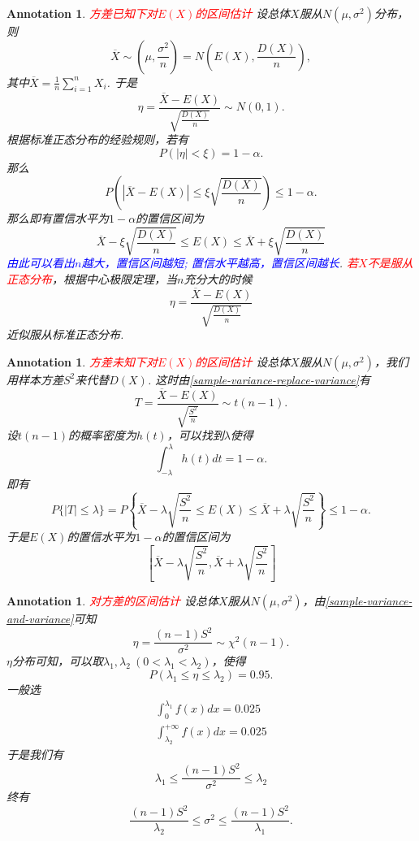 \documentclass{article}
\newtheorem{annotation}[theorem]{Annotation}
\newcommand{\redt}[1]{\textcolor{red}{#1}}
\newcommand{\bluet}[1]{\textcolor{blue}{#1}}
\begin{document}
\begin{annotation}
\rm \redt{方差已知下对$E(X)$的区间估计} 设总体$X$服从$N(\mu,\sigma^2)$分布，则
$$
\overline{X} \sim \left(\mu, \frac{\sigma^2}{n}\right) = N\left(E(X),\frac{D(X)}{n}\right),
$$
其中$\overline{X}= \frac{1}{n}\sum\limits_{i=1}^n X_i$. 于是
$$
\eta = \frac{\overline{X}-E(X)}{\sqrt{\frac{D(X)}{n}}} \sim N(0,1). 
$$
根据标准正态分布的经验规则，若有
$$
P\left(|\eta| < \xi\right) = 1-\alpha.   
$$
那么
$$
P\left( |\overline{X}-E(X)| \leq \xi \sqrt{\frac{D(X)}{n}}   \right) \leq 1-\alpha.
$$
那么即有置信水平为$1-\alpha$的置信区间为
$$
\overline{X} - \xi \sqrt{\frac{D(X)}{n}} \leq E(X) \leq  \overline{X} + \xi \sqrt{\frac{D(X)}{n}}
$$
\bluet{由此可以看出$n$越大，置信区间越短; 置信水平越高，置信区间越长}. \redt{若$X$不是服从正态分布}，根据中心极限定理，当$n$充分大的时候
$$
\eta = \frac{\overline{X}-E(X)}{\sqrt{\frac{D(X)}{n}}}
$$
近似服从标准正态分布. 
\end{annotation}

\begin{annotation}
\rm \redt{方差未知下对$E(X)$的区间估计} 设总体$X$服从$N(\mu,\sigma^2)$，我们用样本方差$S^2$来代替$D(X)$. 这时由\ref{sample-variance-replace-variance}有
$$
T=\frac{\overline{X}-E(X)}{\sqrt{\frac{S^2}{n}}} \sim t(n-1).
$$
设$t(n-1)$的概率密度为$h(t)$，可以找到$\lambda$使得
$$
\int_{-\lambda}^{\lambda} h(t)dt = 1-\alpha.
$$
即有
$$
P\{|T| \leq \lambda \} = P\left\{ \overline{X} - \lambda \sqrt{\frac{S^2}{n}} \leq E(X) \leq  \overline{X} + \lambda \sqrt{\frac{S^2}{n}} \right\} \leq 1-\alpha.
$$
于是$E(X)$的置信水平为$1-\alpha$的置信区间为
$$
\left[ \overline{X} - \lambda \sqrt{\frac{S^2}{n}} ,  \overline{X} + \lambda \sqrt{\frac{S^2}{n}} \right]
$$
\end{annotation}

\begin{annotation}
\rm \redt{对方差的区间估计} 设总体$X$服从$N(\mu,\sigma^2)$，由\ref{sample-variance-and-variance}可知
$$
\eta = \frac{(n-1)S^2}{\sigma^2} \sim \chi^2(n-1).
$$
$\eta$分布可知，可以取$\lambda_1,\lambda_2~(0 < \lambda_1 < \lambda_2)$，使得
$$
P(\lambda_1 \leq \eta \leq \lambda_2) = 0.95.
$$
一般选
$$
\begin{array}{ll}
\int_{0}^{\lambda_1} f(x)dx = 0.025 \\
\int_{\lambda_2}^{+\infty} f(x)dx = 0.025
\end{array}
$$
于是我们有
$$
\lambda_1 \leq \frac{(n-1)S^2}{\sigma^2} \leq \lambda_2
$$
终有
$$
\frac{(n-1)S^2}{\lambda_2} \leq \sigma^2 \leq \frac{(n-1)S^2}{\lambda_1}. 
$$
\end{annotation}
\end{document}
